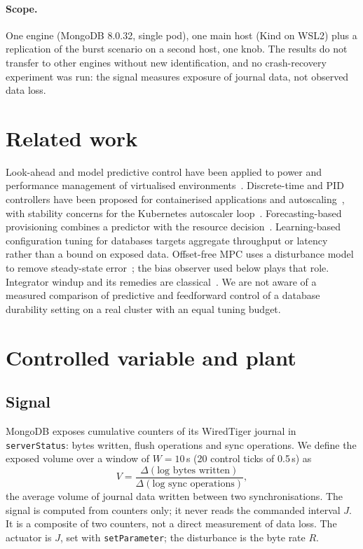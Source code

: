 \documentclass[smallextended]{svjour3}
\begin{document}
\paragraph{Scope.}
One engine (MongoDB 8.0.32, single pod), one main host (Kind on WSL2) plus a replication of the burst scenario on a second host, one knob. The
results do not transfer to other engines without new identification, and no
crash-recovery experiment was run: the signal measures exposure of journal
data, not observed data loss.

\section{Related work}\label{sec:related}
Look-ahead and model predictive control have been applied to power and
performance management of virtualised environments~\cite{kusic2009lookahead,padala2009automated,fang2016qos}.
Discrete-time and PID controllers have been proposed for containerised
applications and autoscaling~\cite{baresi2016discrete,sabuhi2021adaptive,cai2022inverse,pozdniakova2024sla},
with stability concerns for the Kubernetes autoscaler loop~\cite{serracanta2025stability}.
Forecasting-based provisioning combines a predictor with the resource
decision~\cite{roy2011autoscaling,gong2010press,joshi2024arimapid}. Learning-based
configuration tuning for databases targets aggregate throughput or latency~\cite{vanaken2017ottertune,zhang2019cdbtune,ferreira2020selftunable}
rather than a bound on exposed data. Offset-free MPC uses a disturbance model to remove
steady-state error~\cite{muske2002disturbance,pannocchia2003disturbance}; the bias
observer used below plays that role. Integrator windup and its remedies are classical~\cite{astrom1989windup,kothare1994antiwindup}.
We are not aware of a measured comparison of predictive and feedforward control of a database durability setting
on a real cluster with an equal tuning budget.

\section{Controlled variable and plant}\label{sec:plant}
\subsection{Signal}
MongoDB exposes cumulative counters of its WiredTiger journal in
\texttt{serverStatus}: bytes written, flush operations and sync operations. We define the
exposed volume over a window of $W=10$\,s (20 control ticks of 0.5\,s) as
\begin{equation}
V=\frac{\Delta(\text{log bytes written})}{\Delta(\text{log sync operations})},
\end{equation}
the average volume of journal data written between two synchronisations. The
signal is computed from counters only; it never reads the commanded interval $J$. It is a composite of two counters,
not a direct measurement of data loss. The actuator is $J$, set with
\texttt{setParameter}; the disturbance is the byte rate $R$.
\end{document}
